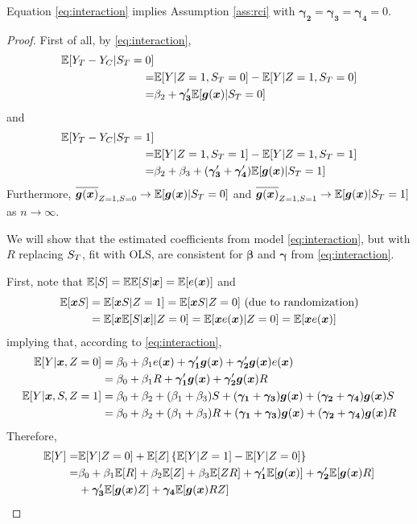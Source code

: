 \documentclass[]{article}
\begin{document}
Equation \eqref{eq:interaction} implies Assumption \ref{ass:rci} with $\bm{\gamma_2}=\bm{\gamma_3}=\bm{\gamma_4}=0$.

\begin{proof}
First of all, by \eqref{eq:interaction},
\begin{equation*}
\begin{split}
  \mathbb{E}[Y_T-Y_C|S_T=0]&\\
  =&\mathbb{E}[Y|Z=1,S_T=0]-\mathbb{E}[Y|Z=1,S_T=0]\\
  =&\beta_2+\bm{\gamma_3}'\mathbb{E}[\bm{g}(\bm{x})|S_T=0]
\end{split}
\end{equation*}
and
\begin{equation*}
\begin{split}
  \mathbb{E}[Y_T-Y_C|S_T=1]&\\
  =&\mathbb{E}[Y|Z=1,S_T=1]-\mathbb{E}[Y|Z=1,S_T=1]\\
  =&\beta_2+\beta_3+(\bm{\gamma_3}'+\bm{\gamma_4}')\mathbb{E}[\bm{g}(\bm{x})|S_T=1]
\end{split}
\end{equation*}
Furthermore, $\overline{\bm{g}(\bm{x})}_{Z=1,S=0}\rightarrow \mathbb{E}[\bm{g}(\bm{x})|S_T=0]$ and $\overline{\bm{g}(\bm{x})}_{Z=1,S=1}\rightarrow \mathbb{E}[\bm{g}(\bm{x})|S_T=1]$ as $n\rightarrow \infty$.

We will show that the estimated coefficients from model \eqref{eq:interaction}, but with $R$ replacing $S_T$, fit with OLS, are consistent for $\bm{\beta}$ and $\bm{\gamma}$ from \eqref{eq:interaction}.

First, note that $\mathbb{E}[S]=\mathbb{E}\mathbb{E}[S|\bm{x}]=\mathbb{E}[e(\bm{x})]$ and
\begin{align*}
  \mathbb{E}[\bm{x} S]&=\mathbb{E}[\bm{x} S|Z=1]=\mathbb{E}[\bm{x} S|Z=0] \mbox{ (due to randomization)}\\
  &=\mathbb{E}[\bm{x}\mathbb{E}[S|\bm{x}]|Z=0]=\mathbb{E}[\bm{x}e(\bm{x})|Z=0]=\mathbb{E}[\bm{x}e(\bm{x})]
\end{align*}
implying that, according to \eqref{eq:interaction},
\begin{equation*}
  \begin{split}
    \mathbb{E}[Y|\bm{x},Z=0]&=\beta_0+\beta_1e(\bm{x})+\bm{\gamma_1}'\bm{g}(\bm{x})+\bm{\gamma_2}'\bm{g}(\bm{x})e(\bm{x})\\
                  &=\beta_0+\beta_1R+\bm{\gamma_1}'\bm{g}(\bm{x})+\bm{\gamma_2}'\bm{g}(\bm{x}) R\\
    \mathbb{E}[Y|\bm{x},S,Z=1]&=\beta_0+\beta_2+(\beta_1+\beta_3)S+(\bm{\gamma_1}+\bm{\gamma_3})\bm{g}(\bm{x})+(\bm{\gamma_2}+\bm{\gamma_4})\bm{g}(\bm{x}) S\\
    &=\beta_0+\beta_2+(\beta_1+\beta_3)R+(\bm{\gamma_1}+\bm{\gamma_3})\bm{g}(\bm{x})+(\bm{\gamma_2}+\bm{\gamma_4})\bm{g}(\bm{x}) R
  \end{split}
\end{equation*}
Therefore,
\begin{align*}
  \mathbb{E}[Y]=&\mathbb{E}[Y|Z=0]+\mathbb{E}[Z]\left\{\mathbb{E}[Y|Z=1]-\mathbb{E}[Y|Z=0]\right\}\\
  =&\beta_0+\beta_1\mathbb{E}[R]+\beta_2\mathbb{E}[Z]+\beta_3\mathbb{E}[ZR]+\bm{\gamma_1}'\mathbb{E}[\bm{g}(\bm{x})]+\bm{\gamma_2}'\mathbb{E}[\bm{g}(\bm{x}) R]\\
  &+\bm{\gamma_3}'\mathbb{E}[\bm{g}(\bm{x}) Z]+\bm{\gamma_4}\mathbb{E}[\bm{g}(\bm{x}) RZ]
\end{align*}


\end{proof}
\end{document}
